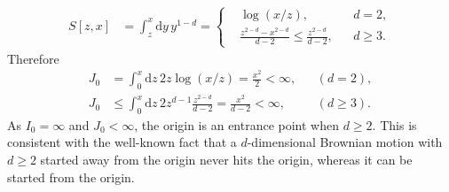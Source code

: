 \documentclass[12pt]{book}
\numberwithin{equation}{chapter}
\theoremstyle{plain}
\numberwithin{theorem}{section}
\theoremstyle{definition}
\numberwithin{exercise}{chapter}
\newcommand{\<}{\langle}
\renewcommand{\>}{\rangle}
\renewcommand{\(}{\left(}
\renewcommand{\)}{\right)}
\renewcommand{\[}{\left[}
\renewcommand{\]}{\right]}
\newcommand\dd{\mathrm{d}}
\begin{document}
\begin{align}
S[z,x]
	&=	\int_z^x \dd y \, y^{1-d}
	=		\left\{ \begin{aligned}
			&\log (x/z) , & & d = 2 , \\
			&\frac{z^{2-d} - x^{2-d}}{d-2} \leq \frac{z^{2-d}}{d-2} , & & d \geq 3 .
			\end{aligned} \right.
\end{align}
Therefore
\begin{align}
J_0
	&=	\int_0^x \dd z \, 2 z \log(x/z)
	=		\frac{x^2}{2}
	<		\infty , &
	&(d = 2) , \\
J_0
	&\leq	\int_0^x \dd z \, 2 z^{d-1} \frac{z^{2-d}}{d-2}
	=		\frac{x^2}{d-2}
	<		\infty , &
	&(d \geq 3) .
\end{align}
As $I_0 = \infty$ and $J_0 < \infty$, the origin is an entrance point when $d \geq 2$.  This is consistent with the well-known fact that a $d$-dimensional Brownian motion with $d \geq 2$ started away from the origin never hits the origin, whereas it can be started from the origin.
\end{document}
